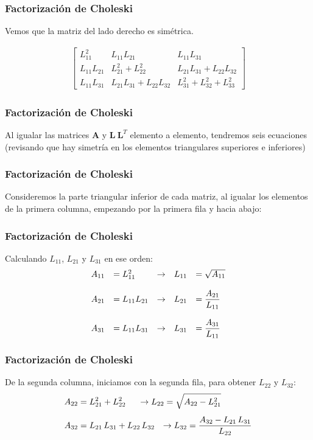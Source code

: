 \begin{frame}[fragile]
\frametitle{Factorización de Choleski}
Vemos que la matriz del lado derecho es simétrica.

\begin{align*}
\begin{bmatrix}
L_{11}^{2} & L_{11}L_{21} & L_{11}L_{31} \\
L_{11}L_{21} & L_{21}^{2} + L_{22}^{2} & L_{21}L_{31} + L_{22}L_{32} \\
L_{11}L_{31} & L_{21}L_{31} + L_{22}L_{32} & L_{31}^{2} + L_{32}^{2} + L_{33}^{2}
\end{bmatrix}
\end{align*}
\end{frame}
\begin{frame}
\frametitle{Factorización de Choleski}
Al igualar las matrices $\mathbf{A}$ y $\mathbf{L \: L}^{T}$ elemento a elemento, tendremos seis ecuaciones (revisando que hay simetría en los elementos triangulares superiores e inferiores)
\end{frame}
\begin{frame}
\frametitle{Factorización de Choleski}
Consideremos la parte triangular inferior de cada matriz, al igualar los elementos de la primera columna, empezando por la primera fila y hacia abajo:
\end{frame}
\begin{frame}
\frametitle{Factorización de Choleski}
Calculando $L_{11}$, $L_{21}$ y $L_{31}$ en ese orden:
\begin{align*}
\begin{array}{l l l l l}
A_{11} & {=L_{11}^{2}}   & \rightarrow & L_{11} & {=\sqrt{A_{11}}} \\
&                 &             &        &  \\
A_{21} & {=L_{11}L_{21}} & \rightarrow & L_{21} & {=\dfrac{A_{21}}{L_{11}}} \\
&                 &             &        &  \\
A_{31} & {=L_{11}L_{31}} & \rightarrow & L_{31} & {=\dfrac{A_{31}}{L_{11}}}
\end{array}
\end{align*}
\end{frame}
\begin{frame}
\frametitle{Factorización de Choleski}
De la segunda columna, iniciamos con la segunda fila, para obtener $L_{22}$ y $L_{32}$:
\begin{align*}
 A_{22} &= L_{21}^{2} + L_{22}^{2} \hspace{0.5cm} \rightarrow L_{22} = \sqrt{A_{22}-L_{21}^{2}} \\[0.5em]
A_{32} &= L_{21} \, L_{31} + L_{22} \, L_{32} \hspace{0.25cm} \rightarrow L_{32} =\dfrac{A_{32} - L_{21} \, L_{31}}{L_{22}}
\end{align*}
\end{frame}
